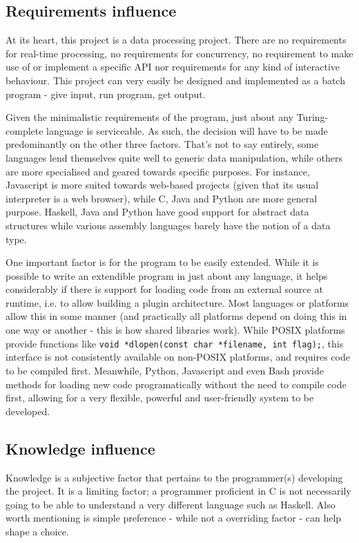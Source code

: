 \documentclass[10pt,a4paper,notitlepage]{report}
\begin{document}
\subsection{Requirements influence}
At its heart, this project is a data processing project. There are no requirements for real-time processing, no requirements for concurrency, no requirement to make use of or implement a specific API nor requirements for any kind of interactive behaviour. This project can very easily be designed and implemented as a batch program - give input, run program, get output.

Given the minimalistic requirements of the program, just about any Turing-complete language is serviceable. As such, the decision will have to be made predominantly on the other three factors. That's not to say entirely, some languages lend themselves quite well to generic data manipulation, while others are more specialised and geared towards specific purposes. For instance, Javascript is more suited towards web-based projects (given that its usual interpreter is a web browser), while C, Java and Python are more general purpose. Haskell, Java and Python have good support for abstract data structures while various assembly languages barely have the notion of a data type.

One important factor is for the program to be easily extended. While it is possible to write an extendible program in just about any language, it helps considerably if there is support for loading code from an external source at runtime, i.e. to allow building a plugin architecture.
Most languages or platforms allow this in some manner (and practically all platforms depend on doing this in one way or another - this is how shared libraries work). While POSIX platforms provide functions like \lstinline$void *dlopen(const char *filename, int flag);$, this interface is not consistently available on non-POSIX platforms, and requires code to be compiled first. Meanwhile, Python, Javascript and even Bash provide methods for loading new code programatically without the need to compile code first, allowing for a very flexible, powerful and user-friendly system to be developed.

\subsection{Knowledge influence}
Knowledge is a subjective factor that pertains to the programmer(s) developing the project. It is a limiting factor; a programmer proficient in C is not necessarily going to be able to understand a very different language such as Haskell. Also worth mentioning is simple preference - while not a overriding factor - can help shape a choice.
\end{document}
